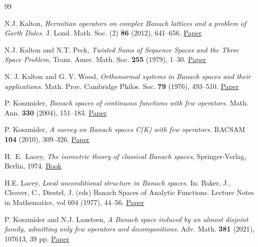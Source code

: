 \documentclass[11pt]{amsart}
\theoremstyle{definition}
\numberwithin{equation}{section}
\begin{document}
\begin{thebibliography}{99}


N.J. Kalton,
\emph{Hermitian operators on complex Banach lattices and a problem of Garth Dales}. J. Lond. Math. Soc. (2) \textbf{86} (2012), 641--656. \href{https://doi.org/10.1112/jlms/jds024}{Paper}


N.J. Kalton and N.T. Peck, \emph{Twisted Sums of Sequence Spaces and the Three Space Problem}, Trans. Amer. Math. Soc. \textbf{255} (1979), 1--30. \href{https://doi.org/10.2307/1998164}{Paper}

 N. J. Kalton and G. V. Wood, \emph{Orthonormal systems in Banach spaces and their applications}. Math. Proc. Cambridge Philos. Soc. \textbf{79} (1976), 493--510. \href{https://doi.org/10.1017/S0305004100052506}{Paper}




P. Koszmider, \emph{Banach spaces of continuous functions with few operators.} Math. Ann. \textbf{330} (2004), 151--183. \href{https://doi.org/10.1007/s00208-004-0544-z}{Paper}


P. Koszmider, \emph{A survey on Banach spaces C(K) with few operators.} RACSAM \textbf{104} (2010), 309--326. \href{https://doi.org/10.5052/RACSAM.2010.19}{Paper}





H.~E.~Lacey, \emph{The isometric theory of classical Banach spaces}, Springer-Verlag, Berlin, 1974. \href{https://doi.org/10.1007/978-3-642-65762-7}{Book}


H.E. Lacey, \emph{Local unconditional structure in Banach spaces.} In: Baker, J., Cleaver, C., Diestel, J. (eds) Banach Spaces of Analytic Functions. Lecture Notes in Mathematics, vol 604 (1977), 44--56. \href{https://doi.org/10.1007/BFb0069205}{Paper}


P. Koszmider and N.J. Laustsen,
\textit{A Banach space induced by an almost disjoint family, admitting only few operators and decompositions.} Adv. Math. \textbf{381} (2021), 107613, 39 pp. \href{https://doi.org/10.1016/j.aim.2021.107613}{Paper}




\end{thebibliography}
\end{document}
